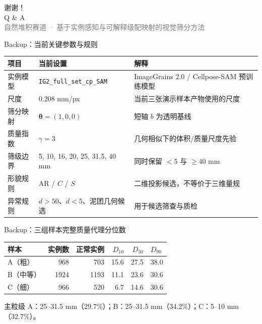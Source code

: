 \documentclass[UTF8,aspectratio=169,11pt]{ctexbeamer}
\newcommand{\smallgray}[1]{{\scriptsize\textcolor{gray}{#1}}}
\begin{document}
\begin{frame}
\centering
\vspace{1.0cm}
{\Huge 谢谢！}\\[0.9em]
{\Large Q \& A}\\[1.0em]
\smallgray{自然堆积赛道 · 基于实例感知与可解释级配映射的视觉筛分方法}
\end{frame}

\appendix

\begin{frame}{Backup：当前关键参数与规则}
\small
\renewcommand{\arraystretch}{1.18}
\begin{tabularx}{\linewidth}{>{\raggedright\arraybackslash}p{3.4cm}X>{\raggedright\arraybackslash}p{5.2cm}}
\toprule
项目 & 当前设置 & 解释 \\
\midrule
实例模型 & \texttt{IG2\_full\_set\_cp\_SAM} & ImageGrains 2.0 / Cellpose-SAM 预训练模型 \\
尺度 & 0.208 mm/px & 当前三张演示样本产物使用的尺度 \\
筛分映射 & $\boldsymbol{\theta}=(1,0,0)$ & 短轴 $b$ 为透明基线 \\
质量指数 & $\gamma=3$ & 几何相似下的体积/质量尺度先验 \\
筛级边界 & 5, 10, 16, 20, 25, 31.5, 40 mm & 同时保留 $<5$ 与 $\ge40$ mm \\
形貌规则 & AR / $C$ / $S$ & 二维投影候选，不等价于三维量规 \\
异常规则 & $d>50$、$d<5$、泥团几何候选 & 用于候选筛查与质检 \\
\bottomrule
\end{tabularx}
\end{frame}

\begin{frame}{Backup：三组样本完整质量代理分位数}
\centering
\small
\renewcommand{\arraystretch}{1.25}
\begin{tabular}{lrrrrl}
\toprule
样本 & 实例数 & 正常实例 & $D_{10}$ & $D_{50}$ & $D_{90}$ \\
\midrule
A（粗） & 968 & 703 & 15.6 & 27.5 & 38.0 \\
B（中等） & 1924 & 1193 & 11.1 & 23.6 & 30.6 \\
C（细） & 966 & 520 & 6.7 & 14.6 & 30.6 \\
\bottomrule
\end{tabular}
\vspace{0.7em}

\begin{block}{主粒级}
\small A：25--31.5 mm（29.7\%）；B：25--31.5 mm（34.2\%）；C：5--10 mm（32.7\%）。
\end{block}
\end{frame}
\end{document}
